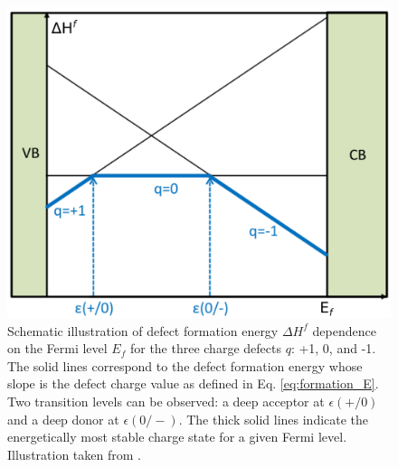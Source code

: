 \begin{figure}[tbh!]
	\centering
	\includegraphics[width=0.5\linewidth]{"images/computational/trans_level"}
	\caption[ Schematic illustration of defect formation energy $\Delta H^f$ dependence on the Fermi level $E_f$ for the three charge defects $q$: +1, 0, and -1 ]{Schematic illustration of defect formation energy $\Delta H^f$ dependence on the Fermi level $E_f$ for the three charge defects $q$: +1, 0, and -1. The solid lines correspond to the defect formation energy whose slope is the defect charge value as defined in Eq. \eqref{eq:formation_E}. Two transition levels can  be observed: a deep acceptor at  $\epsilon(+/0)$ and a deep donor at $\epsilon(0/-)$. The thick solid lines indicate the energetically  most stable charge state for a given Fermi level. Illustration taken from \citep{Freysoldt2014}.}
	\label{fig:trans_level}
\end{figure}






